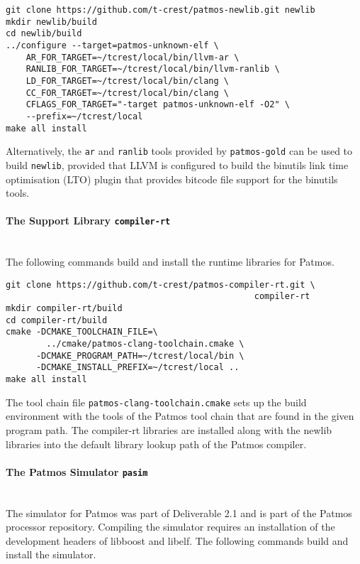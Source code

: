 \begin{verbatim}
git clone https://github.com/t-crest/patmos-newlib.git newlib
mkdir newlib/build
cd newlib/build
../configure --target=patmos-unknown-elf \
    AR_FOR_TARGET=~/tcrest/local/bin/llvm-ar \
    RANLIB_FOR_TARGET=~/tcrest/local/bin/llvm-ranlib \
    LD_FOR_TARGET=~/tcrest/local/bin/clang \
    CC_FOR_TARGET=~/tcrest/local/bin/clang \
    CFLAGS_FOR_TARGET="-target patmos-unknown-elf -O2" \
    --prefix=~/tcrest/local
make all install
\end{verbatim}

Alternatively, the \texttt{ar} and \texttt{ranlib} tools provided by \texttt{patmos-gold} can 
be used to build \texttt{newlib}, provided that LLVM is configured to build the binutils link time optimisation (LTO) plugin that provides
bitcode file support for the binutils tools.
\paragraph{The Support Library \texttt{compiler-rt}} \hfill \\

The following commands build and install the runtime libraries for Patmos.

\begin{verbatim}
git clone https://github.com/t-crest/patmos-compiler-rt.git \
                                                 compiler-rt
mkdir compiler-rt/build
cd compiler-rt/build
cmake -DCMAKE_TOOLCHAIN_FILE=\
        ../cmake/patmos-clang-toolchain.cmake \
      -DCMAKE_PROGRAM_PATH=~/tcrest/local/bin \
      -DCMAKE_INSTALL_PREFIX=~/tcrest/local ..
make all install
\end{verbatim}

The tool chain file \texttt{patmos-clang-toolchain.cmake} sets up the build environment with the tools of the Patmos tool chain 
that are found in the given program path. The compiler-rt libraries are installed
along with the newlib libraries into the default library lookup path
of the Patmos compiler.

\paragraph{The Patmos Simulator \texttt{pasim}} \hfill \\

The simulator for Patmos was part of Deliverable 2.1 and is part of the Patmos processor repository. Compiling the simulator requires an installation of the 
development headers of libboost and libelf. The following commands build and install the simulator.

